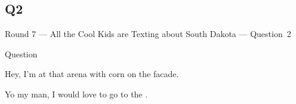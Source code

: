 \documentclass[11pt]{beamer}
\begin{document}
\subsection*{Q2}
\begin{frame}[t]{Round 7 --- All the Cool Kids are Texting about South Dakota --- \mbox{Question 2}}
\begin{block}{Question}

\begin{minipage}{0.9\textwidth}
\begin{mdframed}[
    roundcorner=7pt,
    backgroundcolor=black!5,
    linecolor=black!5,
    fontcolor=black,
    ignorelastdescenders]
\begin{flushleft}
{\small{}\selectfont{}
Hey, I'm at that arena with corn on the facade.
}
\end{flushleft}
\end{mdframed}
\end{minipage}

\hfill{}\begin{minipage}{0.9\textwidth}
\begin{mdframed}[
    roundcorner=7pt,
    backgroundcolor=blue!80!white,
    linecolor=blue!80!white,
    fontcolor=white,
    ignorelastdescenders]
\begin{flushleft}
{\small{}\selectfont{}
Yo my man, I would love to go to the \textunderscore{}\textunderscore{}\textunderscore{}\textunderscore{}\textunderscore{}\textunderscore{} \textunderscore{}\textunderscore{}\textunderscore{}\textunderscore{}\textunderscore{}\textunderscore{} \textunderscore{}\textunderscore{}\textunderscore{}\textunderscore{}\textunderscore{}\textunderscore{}.
}
\end{flushleft}
\end{mdframed}
\end{minipage}
\end{block}
\end{frame}
\end{document}
